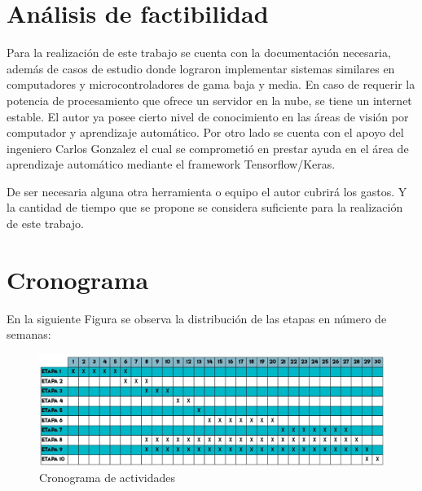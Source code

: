 \documentclass[letterpaper,titlepage,12pt,oneside,spanish,final]{report_eie}
\numberwithin{equation}{chapter}%
\numberwithin{figure}{chapter}%
\numberwithin{table}{chapter}%
\numberwithin{definition}{chapter}%
\numberwithin{lemma}{chapter}%
\numberwithin{theorem}{chapter}%
\numberwithin{corollary}{chapter}%
\numberwithin{condition}{chapter}%
\numberwithin{criterion}{chapter}%
\numberwithin{problem}{chapter}%
\numberwithin{property}{chapter}%
\numberwithin{proposition}{chapter}%
\numberwithin{solution}{chapter}%
\numberwithin{conjecture}{chapter}%
\begin{document}
\section*{Análisis de factibilidad}
Para la realización de este trabajo se cuenta con la documentación necesaria, además de casos de estudio donde lograron implementar sistemas similares en computadores y microcontroladores de gama baja y media. En caso de requerir la potencia de procesamiento que ofrece un servidor en la nube, se tiene un internet estable. El autor ya posee cierto nivel de conocimiento en las áreas de visión por computador y aprendizaje automático. Por otro lado se cuenta con el apoyo del ingeniero Carlos Gonzalez el cual se comprometió en prestar ayuda en el área de aprendizaje automático mediante el framework Tensorflow/Keras.

De ser necesaria alguna otra herramienta o equipo el autor cubrirá los gastos. Y la cantidad de tiempo que se propone se considera suficiente para la realización de este trabajo.
\section*{Cronograma}
En la siguiente Figura se observa la distribución de las etapas en  número de semanas:
\begin{figure}[H]
    \centering
    \includegraphics[scale=0.5]{Anteproyecto/cronograma.jpg}
    \caption{Cronograma de actividades}
    \label{cronograma}
\end{figure}

\newpage

\printbibliography[title={REFERENCIAS}]

\begin{refsection}
    \printbibliography[title={BIBLIOGRAFÍA}]
    \nocite{*}
\end{refsection}





\printindex%
\end{document}
